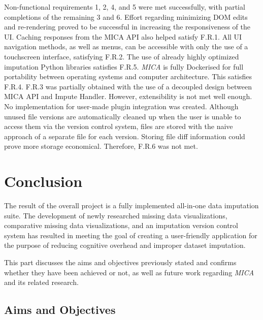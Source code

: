\documentclass[a4paper, 11pt]{article}
\newcommand{\mica}{\textit{MICA }}
\begin{document}
Non-functional requirements 1, 2, 4, and 5 were met successfully, with partial
completions of the remaining 3 and 6. Effort regarding minimizing DOM edits and
re-rendering proved to be successful in increasing the responsiveness of the
UI. Caching responses from the MICA API also helped satisfy F.R.1. All UI
navigation methods, as well as menus, can be accessible with only the use of a
touchscreen interface, satisfying F.R.2. The use of already highly optimized
imputation Python libraries satisfies F.R.5. \mica is fully Dockerised for full
portability between operating systems and computer architecture. This satisfies
F.R.4. F.R.3 was partially obtained with the use of a decoupled design between
MICA API and Impute Handler. However, extensibility is not met well enough. No
implementation for user-made plugin integration was created. Although unused
file versions are automatically cleaned up when the user is unable to access
them via the version control system, files are stored with the naive approach
of a separate file for each version. Storing file diff information could prove
more storage economical. Therefore, F.R.6 was not met.


\section{Conclusion}
The result of the overall project is a fully implemented all-in-one data
imputation suite. The development of newly researched missing data
visualizations, comparative missing data visualizations, and an imputation
version control system has resulted in meeting the goal of creating a
user-friendly application for the purpose of reducing cognitive overhead and
improper dataset imputation.

This part discusses the aims and objectives previously stated and confirms
whether they have been achieved or not, as well as future work regarding \mica
and its related research.
\subsection{Aims and Objectives}
\end{document}
